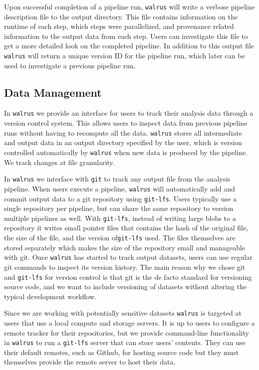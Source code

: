 Upon successful completion of a pipeline run, \texttt{walrus} will write a
verbose pipeline description file to the output directory. This file contains
information on the runtime of each step, which steps were parallelized, and
provenance related information to the output data from each step. Users can
investigate this file to get a more detailed look on the completed pipeline. In
addition to this output file \texttt{walrus} will return a unique version ID for
the pipeline run, which later can be used to investigate a previous pipeline
run.


\subsection{Data Management}
In \texttt{walrus} we provide an interface for users to track their analysis
data through a version control system. 
This allows users to inspect data from previous pipeline runs without having to
recompute all the data. \texttt{walrus} stores all intermediate and output data
in an output directory specified by the user, which is version controlled
automatically by \texttt{walrus} when new data is produced by the pipeline. We
track changes at file granularity. 

In \texttt{walrus} we interface with \texttt{git} to track any output file from
the analysis pipeline. When users execute a pipeline, \texttt{walrus} will
automatically add and commit output data to a git repository using
\texttt{git-lfs}.  Users typically use a single repository per pipeline, but can
share the same repository to version multiple pipelines as well. With
\texttt{git-lfs}, instead of writing large blobs to a repository it writes small
pointer files that contains the hash of the original file, the size of the file,
and the version of\texttt{git-lfs} used. The files themselves are stored
separately which makes the size of the repository small and manageable with git.
Once \texttt{walrus} has started to track output datasets, users can use regular
git commands to inspect its version history. 
The main reason why we chose git and \texttt{git-lfs} for version control is
that git is the de facto standard for versioning source code, and we want to
include versioning of datasets without altering the typical development
workflow. 

Since we are working with potentially sensitive datasets \texttt{walrus} is
targeted at users that use a local compute and storage servers. It is up to
users to configure a remote tracker for their repositories, but we provide
command-line functionality in \texttt{walrus} to run a \texttt{git-lfs} server
that can store users' contents.  They can use their default remotes, such as
Github, for hosting source code but they must themselves provide the remote
server to host their data.

